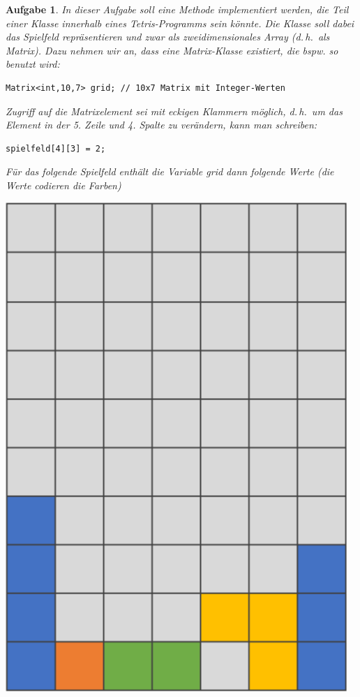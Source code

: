 \documentclass[a4paper,12pt,parskip=full]{scrartcl}
\theoremstyle{exercise}
\newtheorem{exercise}{Aufgabe}
\begin{document}
\begin{exercise}
  In dieser Aufgabe soll eine Methode implementiert werden, die Teil einer Klasse
  innerhalb eines Tetris-Programms sein könnte. Die Klasse soll dabei das Spielfeld
  repräsentieren und zwar als zweidimensionales Array (d.\,h.\ als Matrix). Dazu
  nehmen wir an, dass eine Matrix-Klasse existiert, die bspw. so benutzt wird:
  \begin{lstlisting}
Matrix<int,10,7> grid; // 10x7 Matrix mit Integer-Werten
  \end{lstlisting}
  Zugriff auf die Matrixelement sei mit eckigen Klammern möglich, d.\,h.\ um das Element
  in der 5. Zeile und 4. Spalte zu verändern, kann man schreiben:
  \begin{lstlisting}
spielfeld[4][3] = 2;
  \end{lstlisting}
  Für das folgende Spielfeld enthält die Variable grid dann folgende Werte (die Werte codieren die Farben)
  \begin{multicols}{2}
    \includegraphics[width=0.8\linewidth]{tetris}


\end{multicols}
\end{exercise}
\end{document}
